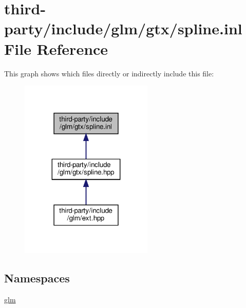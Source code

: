 \hypertarget{spline_8inl}{}\section{third-\/party/include/glm/gtx/spline.inl File Reference}
\label{spline_8inl}
This graph shows which files directly or indirectly include this file\+:
\nopagebreak
\begin{figure}[H]
\begin{center}
\leavevmode
\includegraphics[width=179pt]{spline_8inl__dep__incl}
\end{center}
\end{figure}
\subsection*{Namespaces}
\begin{DoxyCompactItemize}
\item 
 \hyperlink{namespaceglm}{glm}
\end{DoxyCompactItemize}
